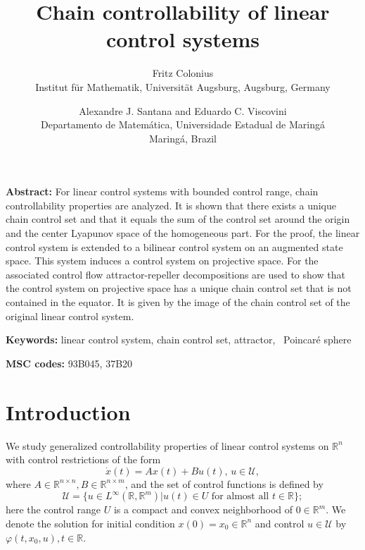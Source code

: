\documentclass{siamltex}%
\begin{document}
\title{Chain controllability of linear control systems}
\author{Fritz Colonius\\Institut f\"{u}r Mathematik, Universit\"{a}t Augsburg, Augsburg, Germany
\and Alexandre J. Santana and Eduardo C. Viscovini\\Departamento de Matem\'{a}tica, Universidade Estadual de Maring\'{a}\\Maring\'{a}, Brazil}
\maketitle

\begin{center}

\end{center}

\textbf{Abstract: }For linear control systems with bounded control range,
chain controllability properties are analyzed. It is shown that there exists a
unique chain control set and that it equals the sum of the control set around
the origin and the center Lyapunov space of the homogeneous part. For the
proof, the linear control system is extended to a bilinear control system on
an augmented state space. This system induces a control system on projective
space. For the associated control flow attractor-repeller decompositions are
used to show that the control system on projective space has a unique chain
control set that is not contained in the equator. It is given by the image of
the chain control set of the original linear control system.

\textbf{Keywords: }linear control system, chain control set, attractor,
\ Poincar\'{e} sphere

\textbf{MSC codes: }93B045, 37B20

\section{Introduction\label{Section1}}

We study generalized controllability properties of linear control systems on
$\mathbb{R}^{n}$ with control restrictions of the form%
\begin{equation}
\dot{x}(t)=Ax(t)+Bu(t),\,u\in\mathcal{U}, \label{1}%
\end{equation}
where $A\in\mathbb{R}^{n\times n},B\in\mathbb{R}^{n\times m}$, and the set of
control functions is defined by%
\begin{equation}
\mathcal{U}=\{u\in L^{\infty}(\mathbb{R},\mathbb{R}^{m})\left\vert u(t)\in
U\text{ for almost all }t\in\mathbb{R}\right.  \}; \label{U}%
\end{equation}
here the control range $U$ is a compact and convex neighborhood of
$0\in\mathbb{R}^{m}$. We denote the solution for initial condition
$x(0)=x_{0}\in\mathbb{R}^{n}$ and control $u\in\mathcal{U}$ by $\varphi
(t,x_{0},u),t\in\mathbb{R}$.
\end{document}
